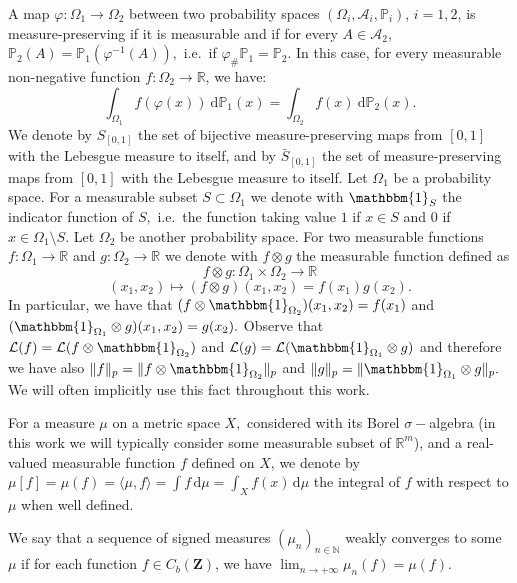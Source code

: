 \documentclass[11pt]{article}
\def\R{\mathbb{R}}
\def\N{\mathbb{N}}
\def\P{\mathbb{P}}
\newcommand{\cL}{{\mathcal L}}  %
\newcommand{\Space}{\mathbf{Z}}
\newcommand{\CbFunct}{C_b(\Space)}
\newcommand{\InvRelabel}{S_{[0,1]}}
\newcommand{\Relabel}{\bar{S}_{[0,1]}}
\renewcommand{\P}{\mathbb{P}}
\newcommand{\drv}{\mathrm{d}}
\newcommand{\rd}{\mathrm{d}}
\begin{document}
A map $\varphi : \Omega_1 \to \Omega_2$ between two probability spaces $(\Omega_i, \mathcal{A}_i, \P_i)$, $i=1,2$, is measure-preserving if it is measurable and if for every $A\in \mathcal{A}_2$, $\P_2(A) = \P_1(\varphi^{-1}(A)),$ i.e.\ if $\varphi_{\#}\P_1=\P_2$.
In this case, for every measurable non-negative function $f: \Omega_2 \to \R$,
we have:
\begin{equation}
   \label{eq:re-label}
 \int_{\Omega_1} f(\varphi(x))\ \drv \P_1(x) = \int_{\Omega_2} f(x)\
 \drv \P_2(x).
\end{equation}
We denote by $  \InvRelabel$ the set of bijective measure-preserving maps from $[0,1]$ with the Lebesgue measure to itself, and by $\Relabel$ the set of   measure-preserving maps from $[0,1]$ with the Lebesgue measure to itself. 
\newline
Let $\Omega_1$ be a probability space. For a measurable subset $S\subset \Omega_1$ we denote with $\mathbbm{1}_{S}$ the indicator function of $S,$ i.e.\ the function taking value $1$ if $x\in S $ and $0$ if $x\in \Omega_1\setminus S. $
Let $\Omega_2$ be another probability space. For two measurable functions $f:\Omega_1\rightarrow \R$ and $g:\Omega_2 \rightarrow \R$ we denote with $f\otimes g$ the measurable function defined as $$
f\otimes g:\Omega_1 \times \Omega_2\rightarrow \R$$
$$(x_1,x_2)\mapsto (f\otimes g)(x_1,x_2)=f(x_1)g(x_2).$$
In particular, we have that $(f\otimes\mathbbm{1}_{\Omega_2})(x_1,x_2)=f(x_1)$ and $(\mathbbm{1}_{\Omega_1}\otimes g)(x_1,x_2)=g(x_2).$ Observe that $\mathcal{L}(f)=\mathcal{L}(f\otimes\mathbbm{1}_{\Omega_2})$ and $\cL(g)=\cL(\mathbbm{1}_{\Omega_1}\otimes g)$ and therefore we have also $\|f\|_p=\|f\otimes\mathbbm{1}_{\Omega_2}\|_p$ and $\|g\|_p=\|\mathbbm{1}_{\Omega_1}\otimes g\|_p.$ We will often implicitly use this fact throughout this work.
\newline

For a measure $\mu$ on a metric space $X,$ considered with its Borel $\sigma-$algebra (in this work we will typically consider some measurable subset of $\R^m$), and a real-valued measurable function $f$ defined on $X$, we denote by $\mu[f]=\mu(f)=\langle \mu, f \rangle=
\int f \, \rd \mu=\int_{X} f(x)\, \rd\mu$ the integral of $f$ with respect to $\mu$ when well defined. 

We say that a sequence  of signed measures $(\mu_n)_{n\in\N}$  weakly converges to some $\mu$ if for each function $f\in   \CbFunct$, we have $\lim_{n\to +\infty} \mu_n(f) = \mu(f)$. \newline
\end{document}
